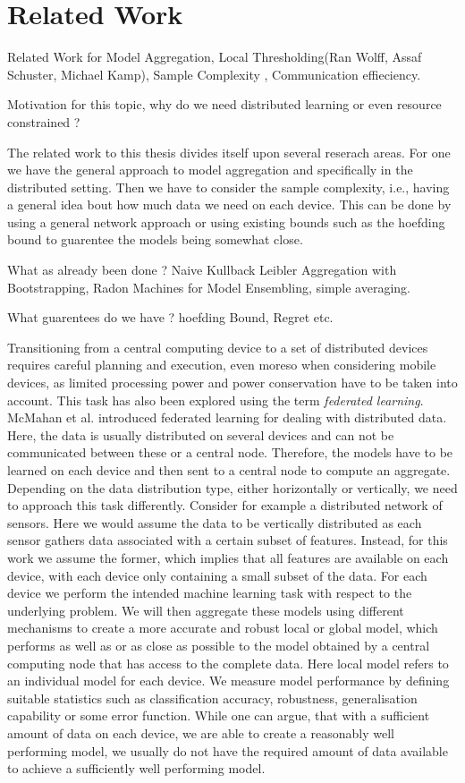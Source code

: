 \section{Related Work}
Related Work for Model Aggregation, Local Thresholding(Ran Wolff, Assaf Schuster, Michael Kamp), Sample Complexity , Communication effieciency.


Motivation for this topic, why do we need distributed learning or even resource constrained ?

The related work to this thesis divides itself upon several reserach areas. 
For one we have the general approach to model aggregation and specifically in the distributed setting.
Then we have to consider the sample complexity, i.e., having a general idea bout how much data we need on each device.
This can be done by using a general network approach or using existing bounds such as the hoefding bound to guarentee the models being somewhat close.

What as already been done ?
Naive Kullback Leibler Aggregation with Bootstrapping, Radon Machines for Model Ensembling, simple averaging.

What guarentees do we have ? 
hoefding Bound, Regret etc.

Transitioning from a central computing device to a set of distributed devices requires careful planning and execution, even moreso when considering mobile devices, as limited processing power and power conservation have to be taken into account.
This task has also been explored using the term \textit{federated learning}.
McMahan et al. \cite{mcmahan2016communication} introduced federated learning for dealing with distributed data.
Here, the data is usually distributed on several devices and can not be communicated between these or a central node. 
Therefore, the models have to be learned on each device and then sent to a central node to compute an aggregate.
Depending on the data distribution type, either horizontally or vertically, we need to approach this task differently. 
Consider for example a distributed network of sensors.
Here we would assume the data to be vertically distributed as each sensor gathers data associated with a certain subset of features.
Instead, for this work we assume the former, which implies that all features are available on each device, with each device only containing a small subset of the data.
For each device we perform the intended machine learning task with respect to the underlying problem.
We will then aggregate these models using different mechanisms to create a more accurate and robust local or global model, which performs as well as or as close as possible to the model obtained by a central computing node that has access to the complete data.
Here local model refers to an individual model for each device.
We measure model performance by defining suitable statistics such as classification accuracy, robustness, generalisation capability or some error function.
While one can argue, that with a sufficient amount of data on each device, we are able to create a reasonably well performing model, we usually do not have the required amount of data available to achieve a sufficiently well performing model.

